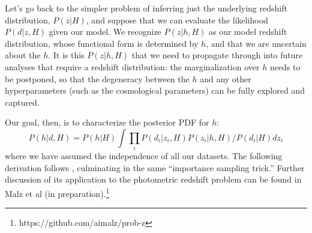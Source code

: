 \documentclass[11pt]{amsart}
\begin{document}
Let's go back to the simpler problem of inferring just the underlying
redshift distribution, $P(z|H)$, and suppose that we can evaluate the
likelihood $P(d|z,H)$ given our model. We recognize $P(z|h,H)$ as our
model redshift distribution, whose functional form is determined by $h$,
and that we are uncertain about the $h$. It is this $P(z|h,H)$ that we
need to propagate through into future analyses that require a redshift
distribution: the marginalization over $h$ needs to be postponed, so
that the degeneracy between the $h$ and any other hyperparameters (such
as the cosmological parameters) can be fully explored and captured.

Our goal, then, is to characterize the posterior PDF for $h$:
\begin{equation}
   P(h|d,H) = P(h|H) \int \prod_i P(d_i|z_i,H) P(z_i|h,H) / P(d_i|H) dz_i
\end{equation}
where we have assumed the independence of all our datasets. The
following derivation follows \citep{ForemanMackeyEtal2014}, culminating
in the same ``importance sampling trick.'' Further discussion of its
application to the photometric redshift problem can be found in Malz et
al (in preparation).\footnote{https://github.com/aimalz/prob-z}
\end{document}
